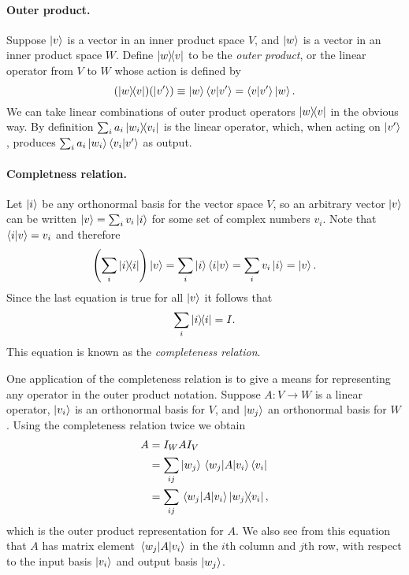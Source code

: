 \documentclass{article}
\begin{document}
\paragraph{Outer product.} Suppose $\ket{v}$ is a vector in an inner product space $V$, and $\ket{w}$ is a vector in an inner product space $W$. Define $\ketbra{w}{v}$ to be the \emph{outer product}, or the linear operator from $V$ to $W$ whose action is defined by \begin{equation}\label{eq:out-prod}
  (\ketbra{w}{v})(\ket{v'}) \equiv \ket{w}\braket{v}{v'} = \braket{v}{v'}\ket{w}.
\end{equation}
We can take linear combinations of outer product operators $\ketbra{w}{v}$ in the obvious way. By definition $\sum_i a_i\ketbra{w_i}{v_i}$ is the linear operator, which, when acting on $\ket{v'}$, produces $\sum_i a_i\ket{w_i}\braket{v_i}{v'}$ as output.

\paragraph{Completness relation.} Let $\ket{i}$ be any orthonormal basis for the vector space $V$, so an arbitrary vector $\ket{v}$ can be written $\ket{v} = \sum_i v_i\ket{i}$ for some set of complex numbers $v_i$. Note that $\braket{i}{v} = v_i$ and therefore \begin{equation*}
  \left(\sum_i \ketbra{i}{i}\right)\ket{v} = \sum_i \ket{i}\braket{i}{v} = \sum_i v_i\ket{i} = \ket{v}.
\end{equation*} Since the last equation is true for all $\ket{v}$ it follows that \begin{equation} \label{eq:comp-rel}
  \sum_i \ketbra{i}{i} = I.
\end{equation} This equation is known as the \emph{completeness relation}.

One application of the completeness relation is to give a means for representing any operator in the outer product notation. Suppose $A : V \rightarrow W$ is a linear operator, $\ket{v_i}$ is an orthonormal basis for $V$, and $\ket{w_j}$ an orthonormal basis for $W$. Using the completeness relation twice we obtain \begin{align}
  A &= I_WAI_V \nonumber \\
    &= \sum_{ij} \ket{w_j}\mel{w_j}{A}{v_i}\bra{v_i} \nonumber \\
    &= \sum_{ij} \mel{w_j}{A}{v_i}\ketbra{w_j}{v_i}, \label{eq:out-prod-rep}
\end{align} which is the outer product representation for $A$. We also see from this equation that $A$ has matrix element $\mel{w_j}{A}{v_i}$ in the $i$th column and $j$th row, with respect to the input basis $\ket{v_i}$ and output basis $\ket{w_j}$.
\end{document}
